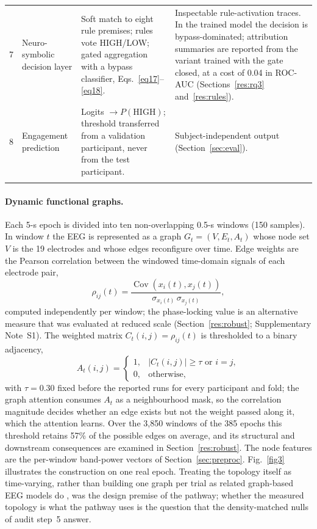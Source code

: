 \begin{table}[!htbp]
\begin{tabular}{@{}p{0.3cm}p{2.9cm}p{5.2cm}p{5.2cm}@{}}
7 & Neuro-symbolic decision layer & Soft match to eight rule premises; rules vote HIGH/LOW; gated aggregation with a bypass classifier, Eqs.~\eqref{eq17}--\eqref{eq18}. & Inspectable rule-activation traces. In the trained model the decision is bypass-dominated; attribution summaries are reported from the variant trained with the gate closed, at a cost of 0.04 in ROC-AUC (Sections~\ref{res:rq3} and~\ref{res:rules}). \\
8 & Engagement prediction & Logits $\rightarrow P(\mathrm{HIGH})$; threshold transferred from a validation participant, never from the test participant. & Subject-independent output (Section~\ref{sec:eval}). \\
\botrule
\end{tabular}
\end{table}

\paragraph{Dynamic functional graphs.} Each 5-s epoch is divided into ten non-overlapping 0.5-s windows (150 samples). In window $t$ the EEG is represented as a graph $G_t=(V,E_t,A_t)$ whose node set $V$ is the 19 electrodes and whose edges reconfigure over time. Edge weights are the Pearson correlation between the windowed time-domain signals of each electrode pair,
\begin{equation}
\rho_{ij}(t) = \frac{\operatorname{Cov}\!\left(x_i(t), x_j(t)\right)}{\sigma_{x_i(t)}\,\sigma_{x_j(t)}}, \label{eq2pearson}
\end{equation}
computed independently per window; the phase-locking value is an alternative measure that was evaluated at reduced scale (Section~\ref{res:robust}; Supplementary Note~S1). The weighted matrix $C_t(i,j)=\rho_{ij}(t)$ is thresholded to a binary adjacency,
\begin{equation}
A_t(i,j) = \begin{cases} 1, & |C_t(i,j)| \geq \tau \text{ or } i=j, \\ 0, & \text{otherwise}, \end{cases} \label{eq3}
\end{equation}
with $\tau=0.30$ fixed before the reported runs for every participant and fold; the graph attention consumes $A_t$ as a neighbourhood mask, so the correlation magnitude decides whether an edge exists but not the weight passed along it, which the attention learns. Over the 3{,}850 windows of the 385 epochs this threshold retains 57\% of the possible edges on average, and its structural and downstream consequences are examined in Section~\ref{res:robust}. The node features are the per-window band-power vectors of Section~\ref{sec:preproc}. Fig.~\ref{fig3} illustrates the construction on one real epoch. Treating the topology itself as time-varying, rather than building one graph per trial as related graph-based EEG models do \cite{ref19,ref20,ref21,ref22}, was the design premise of the pathway; whether the measured topology is what the pathway uses is the question that the density-matched nulls of audit step~5 answer.

